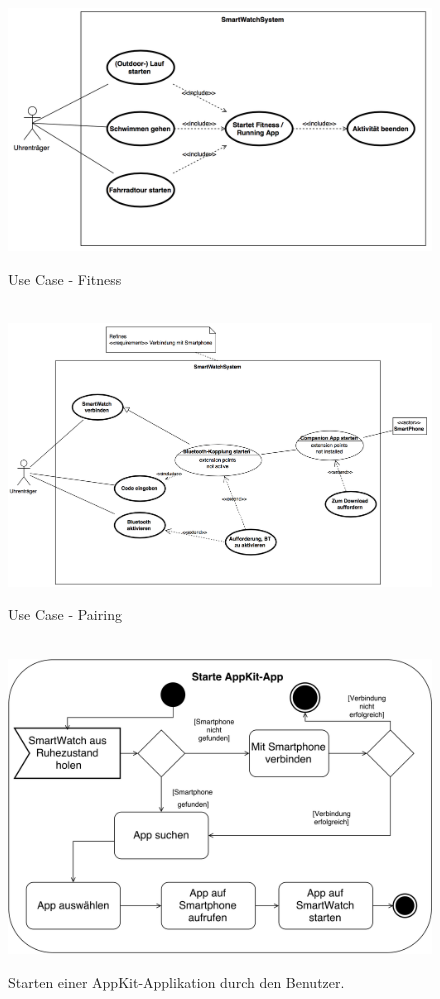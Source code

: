 \begin{appendices}
\begin{figure}[H]
\centering\
\includegraphics[width=14cm]{img/usecase-fitness-p1}
\caption{Use Case - Fitness}\label{fig:usecase-fitness-p1}
\end{figure}

\begin{figure}[H]
\centering\
\includegraphics[width=14cm]{img/usecase-pairing-p1}
\caption{Use Case - Pairing}\label{fig:usecase-pairing-p1}
\end{figure}

\begin{figure}[h]
\centering\
\includegraphics[width=\textwidth]{img/activityAppKit}
\caption{Starten einer AppKit-Applikation durch den Benutzer.}\label{fig:activityAppKit}
\end{figure}


\end{appendices}
